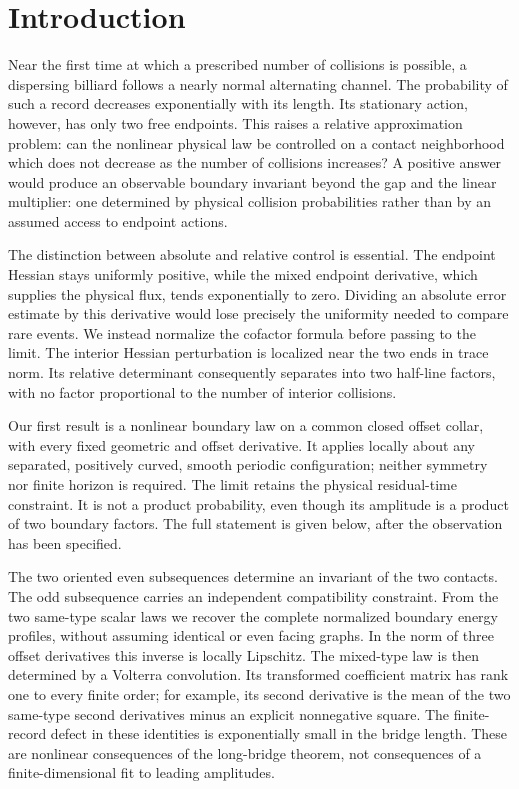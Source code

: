 \section{Introduction}
\label{sec:geometric-results}
Near the first time at which a prescribed number of collisions is possible,
a dispersing billiard follows a nearly normal alternating channel. The
probability of such a record decreases exponentially with its length.
Its stationary action, however, has only two free endpoints. This raises
a relative approximation problem: can the nonlinear physical law be
controlled on a contact neighborhood which does not decrease as the
number of collisions increases? A positive answer would produce an
observable boundary invariant beyond the gap and the linear multiplier:
one determined by physical collision probabilities rather than by an
assumed access to endpoint actions.

The distinction between absolute and relative control is essential.
The endpoint Hessian stays uniformly positive, while the mixed endpoint
derivative, which supplies the physical flux, tends exponentially to
zero. Dividing an absolute error estimate by this derivative would lose
precisely the uniformity needed to compare rare events. We instead
normalize the cofactor formula before passing to the limit. The interior
Hessian perturbation is localized near the two ends in trace norm. Its
relative determinant consequently separates into two half-line factors,
with no factor proportional to the number of interior collisions.

Our first result is a nonlinear boundary law on a common closed offset
collar, with every fixed geometric and offset derivative. It applies
locally about any separated, positively curved, smooth periodic
configuration; neither symmetry nor finite horizon is required. The
limit retains the physical residual-time constraint. It is not a product
probability, even though its amplitude is a product of two boundary
factors. The full statement is given below, after the observation has
been specified.

The two oriented even subsequences determine an invariant of the two
contacts. The odd subsequence carries an independent compatibility
constraint. From the two same-type scalar laws we recover the complete
normalized boundary energy profiles, without assuming identical or
even facing graphs. In the norm of three offset derivatives this
inverse is locally Lipschitz. The mixed-type law is then determined
by a Volterra convolution. Its transformed coefficient matrix has
rank one to every finite order; for example, its second derivative
is the mean of the two same-type second derivatives minus an explicit
nonnegative square. The finite-record defect in these identities is
exponentially small in the bridge length. These are nonlinear
consequences of the long-bridge theorem, not consequences of a
finite-dimensional fit to leading amplitudes.

